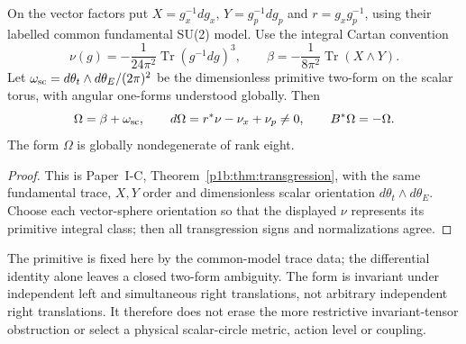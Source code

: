 \documentclass[11pt,a4paper]{article}
\begin{document}
\begin{theorem}
\label{p3b:thm:v203-reciprocal-transgression}
On the vector factors put $X=g_x^{-1}dg_x$, $Y=g_p^{-1}dg_p$ and
$r=g_xg_p^{-1}$, using their labelled common fundamental SU(2) model.
Use the integral Cartan convention
\[
 \nu(g)=-\frac{1}{24\pi^2}\operatorname{Tr}(g^{-1}dg)^3,\qquad
 \beta=-\frac{1}{8\pi^2}\operatorname{Tr}(X\wedge Y).
\]
Let $\omega_{\rm sc}=d\theta_t\wedge d\theta_E/(2\pi)^2$ be the
dimensionless primitive two-form on the scalar torus, with angular
one-forms understood globally. Then
\[
 \Omega=\beta+\omega_{\rm sc},\qquad
 d\Omega=r^*\nu-\nu_x+\nu_p\ne0,
 \qquad B^*\Omega=-\Omega.
\]
The form $\Omega$ is globally nondegenerate of rank eight.
\end{theorem}
\begin{proof}
This is Paper~I-C, Theorem~\ref{p1b:thm:transgression}, with the same
fundamental trace, \(X,Y\) order and dimensionless scalar orientation
\(d\theta_t\wedge d\theta_E\).  Choose each vector-sphere orientation
so that the displayed \(\nu\) represents its primitive integral class;
then all transgression signs and normalizations agree.
\end{proof}
The primitive is fixed here by the common-model trace data; the
differential identity alone leaves a closed two-form ambiguity. The form
is invariant under independent left and simultaneous right translations,
not arbitrary independent right translations. It therefore does not erase
the more restrictive invariant-tensor obstruction or select a physical
scalar-circle metric, action level or coupling.
\end{document}
